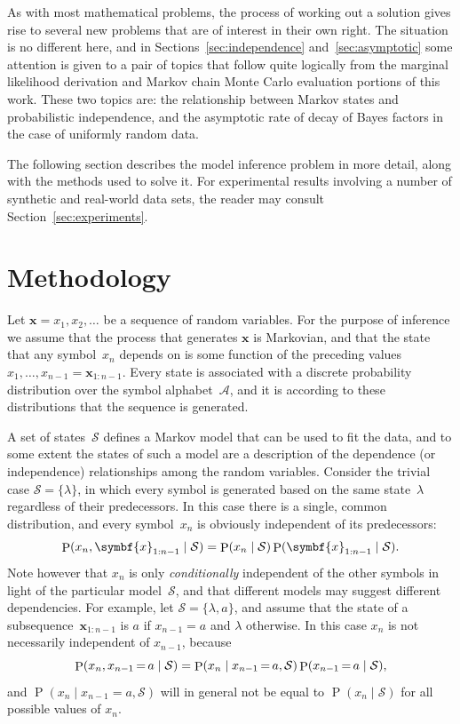 \documentclass[11pt,a4paper]{article}
\newcommand\mc[1]{\mathcal{#1}}               %
\newcommand\ub[1]{\symbf{#1}}                 %
\DeclareMathOperator\Pb{P}                    %
\DeclarePairedDelimiter\lr{\lparen}{\rparen}  %
\newcommand\peq{\mathop{=}}              %
\begin{document}
As with most mathematical problems, the process of working out a solution gives
rise to several new problems that are of interest in their own right. The
situation is no different here, and in Sections~\ref{sec:independence}
and~\ref{sec:asymptotic} some attention is given to a pair of topics that follow
quite logically from the marginal likelihood derivation and Markov chain Monte
Carlo evaluation portions of this work. These two topics are: the relationship
between Markov states and probabilistic independence, and the asymptotic rate of
decay of Bayes factors in the case of uniformly random data.

The following section describes the model inference problem in more detail,
along with the methods used to solve it. For experimental results involving a
number of synthetic and real-world data sets, the reader may consult
Section~\ref{sec:experiments}.

\section{Methodology} %

Let \(\ub{x} = x_1, x_2, \dotsc\) be a sequence of random variables. For the
purpose of inference we assume that the process that generates \(\ub{x}\) is
Markovian, and that the state that any symbol~\(x_n\) depends on is some
function of the preceding values~\(x_1, \dots, x_{n-1} = \ub{x}_{1:n-1}\). Every
state is associated with a discrete probability distribution over the symbol
alphabet~\(\mc{A}\), and it is according to these distributions that the
sequence is generated.

A set of states~\(\mc{S}\) defines a Markov model that can be used to fit the
data, and to some extent the states of such a model are a description of the
dependence (or independence) relationships among the random variables. Consider
the trivial case \(\mc{S} = \{\lambda\}\), in which every symbol is generated
based on the same state~\(\lambda\) regardless of their predecessors. In this
case there is a single, common distribution, and every symbol~\(x_n\) is
obviously independent of its predecessors:
\begin{equation*}
  \Pb\lr{x_n, \ub{x}_{1:n-1} \mid \mc{S}} =
    \Pb\lr{x_n \mid \mc{S}} \Pb\lr{\ub{x}_{1:n-1} \mid \mc{S}}.
\end{equation*}
Note however that \(x_n\) is only \emph{conditionally} independent of the other
symbols in light of the particular model~\(\mc{S}\), and that different models
may suggest different dependencies. For example, let \(\mc{S} = \{\lambda,
a\}\), and assume that the state of a subsequence~\(\ub{x}_{1:n-1}\) is \(a\) if
\(x_{n-1} = a\) and \(\lambda\) otherwise. In this case \(x_n\) is not
necessarily independent of \(x_{n-1}\), because
\begin{equation*}
  \Pb\lr{x_n, x_{n-1} \peq a \mid \mc{S}} =
    \Pb\lr{x_n \mid x_{n-1} \peq a, \mc{S}} \Pb\lr{x_{n-1} \peq a \mid \mc{S}},
\end{equation*}
and \({\Pb(x_n \mid x_{n-1} \peq a, \mc{S})}\) will in general not be equal to
\(\Pb(x_n \mid \mc{S})\) for all possible values of \(x_n\).
\end{document}
